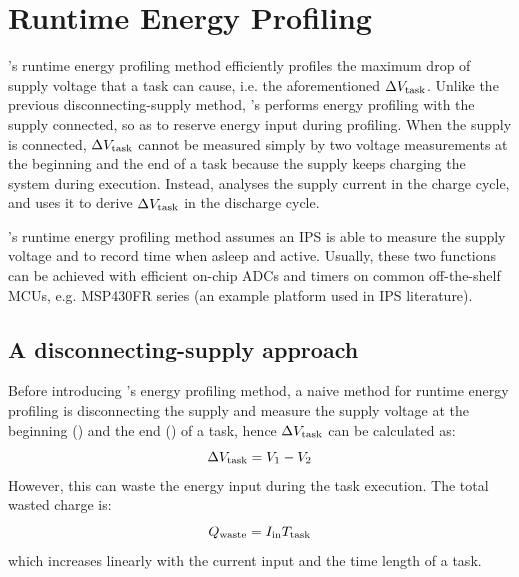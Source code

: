 \section{\nn{} Runtime Energy Profiling} \label{sec:method1}

\nn{}'s runtime energy profiling method efficiently profiles the maximum drop of supply voltage that a task can cause, i.e. the aforementioned $\Delta V_{\text{task}}$. 
Unlike the previous disconnecting-supply method, \nn{}'s performs energy profiling with the supply connected, so as to reserve energy input during profiling.
When the supply is connected, $\Delta V_{\text{task}}$ cannot be measured simply by two voltage measurements at the beginning and the end of a task because the supply keeps charging the system during execution. 
Instead, \nn{} analyses the supply current in the charge cycle, and uses it to derive $\Delta V_{\text{task}}$ in the discharge cycle. 

\nn{}'s runtime energy profiling method assumes an IPS is able to measure the supply voltage and to record time when asleep and active. 
Usually, these two functions can be achieved with efficient on-chip ADCs and timers on common off-the-shelf MCUs, e.g. MSP430FR series (an example platform used in IPS literature). 


\subsection{A disconnecting-supply approach}

Before introducing \nn{}'s energy profiling method, a naive method for runtime energy profiling is disconnecting the supply and measure the supply voltage at the beginning () and the end () of a task, hence $\Delta V_{\text{task}}$ can be calculated as:
\begin{equation}
    \Delta V_{\text{task}} = V_{\text{1}} - V_{\text{2}}
    \label{eq:naive_profiling}
\end{equation}
However, this can waste the energy input during the task execution. 
The total wasted charge is: 
\begin{equation}
    Q_{\text{waste}} = I_{\text{in}}T_{\text{task}}
    \label{eq:qwaste}
\end{equation}
which increases linearly with the current input and the time length of a task. 


